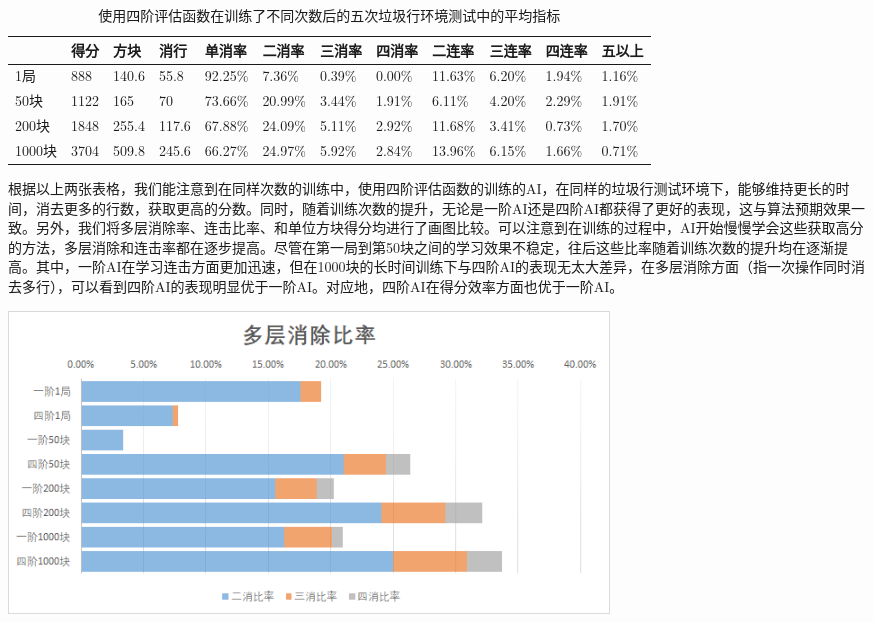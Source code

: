 \documentclass[10pt,UTF8]{article}
\newenvironment{Figure}
  {\par\medskip\noindent\minipage{\linewidth}}
  {\endminipage\par\medskip}
\begin{document}
\begin{table}[h]
    \centering
    \caption{使用四阶评估函数在训练了不同次数后的五次垃圾行环境测试中的平均指标}
    \begin{tabular}{@{}llllllllllll@{}}
    \toprule
          & 得分   & 方块    & 消行    & 单消率     & 二消率     & 三消率    & 四消率    & 二连率     & 三连率    & 四连率    & 五以上    \\ \midrule
    1局    & 888  & 140.6 & 55.8  & 92.25\% & 7.36\%  & 0.39\% & 0.00\% & 11.63\% & 6.20\% & 1.94\% & 1.16\% \\
    50块   & 1122 & 165   & 70    & 73.66\% & 20.99\% & 3.44\% & 1.91\% & 6.11\%  & 4.20\% & 2.29\% & 1.91\% \\
    200块  & 1848 & 255.4 & 117.6 & 67.88\% & 24.09\% & 5.11\% & 2.92\% & 11.68\% & 3.41\% & 0.73\% & 1.70\% \\
    1000块 & 3704 & 509.8 & 245.6 & 66.27\% & 24.97\% & 5.92\% & 2.84\% & 13.96\% & 6.15\% & 1.66\% & 0.71\% \\ \bottomrule
    \end{tabular}
    \end{table}

\begin{multicols}{2}

根据以上两张表格，我们能注意到在同样次数的训练中，使用四阶评估函数的训练的AI，在同样的垃圾行测试环境下，能够维持更长的时间，消去更多的行数，获取更高的分数。同时，随着训练次数的提升，无论是一阶AI还是四阶AI都获得了更好的表现，这与算法预期效果一致。另外，我们将多层消除率、连击比率、和单位方块得分均进行了画图比较。可以注意到在训练的过程中，AI开始慢慢学会这些获取高分的方法，多层消除和连击率都在逐步提高。尽管在第一局到第50块之间的学习效果不稳定，往后这些比率随着训练次数的提升均在逐渐提高。其中，一阶AI在学习连击方面更加迅速，但在1000块的长时间训练下与四阶AI的表现无太大差异，在多层消除方面（指一次操作同时消去多行），可以看到四阶AI的表现明显优于一阶AI。对应地，四阶AI在得分效率方面也优于一阶AI。


\end{multicols}

\begin{Figure}
    \centering
    \includegraphics[width=0.7\textwidth]{figure/result1.png}
\end{Figure}
\end{document}
